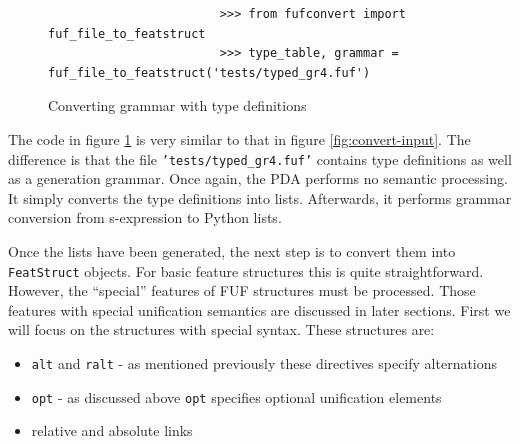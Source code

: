 \documentclass[12pt]{article}
\begin{document}
{\begin{figure}[h!]
    {\scriptsize
    \begin{verbatim}
                        >>> from fufconvert import fuf_file_to_featstruct
                        >>> type_table, grammar = fuf_file_to_featstruct('tests/typed_gr4.fuf') \end{verbatim}
    }
\caption{Converting grammar with type definitions}
\label{fig:convert-input-with-type}
\end{figure}
The code in figure \ref{fig:convert-input-with-type} is very similar to that in figure \ref{fig:convert-input}. The difference
is that the file \texttt{\small 'tests/typed\_gr4.fuf'} contains type definitions as well as a generation grammar. Once again, the 
PDA performs no semantic processing. It simply converts the type definitions into lists. Afterwards, it performs
grammar conversion from s-expression to Python lists.

Once the lists have been generated, the next step is to convert them into \texttt{FeatStruct} objects. For basic 
feature structures this is quite straightforward. However, the ``special'' features of FUF structures
must be processed. Those features with special unification semantics are discussed in later sections.  
First we will focus on the structures with special syntax. These structures are:

\begin{itemize}
    \item \texttt{alt} and \texttt{ralt} - as mentioned previously these directives specify alternations 
    \item \texttt{opt} - as discussed above \texttt{opt} specifies optional unification elements
    \item relative and absolute links 
\end{itemize}

}
\end{document}
